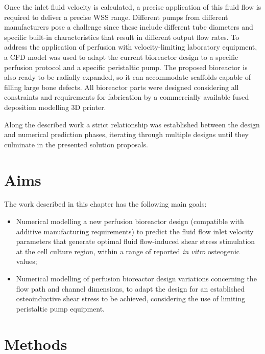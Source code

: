 Once the inlet fluid velocity is calculated, a precise application of this fluid flow is required to deliver a precise \ac{WSS} range. Different pumps from different manufacturers pose a challenge since these include different tube diameters and specific built-in characteristics that result in different output flow rates. To address the application of perfusion with velocity-limiting laboratory equipment, a \ac{CFD} model was used to adapt the current bioreactor design to a specific perfusion protocol and a specific peristaltic pump. The proposed bioreactor is also ready to be radially expanded, so it can accommodate scaffolds capable of filling large bone defects. All bioreactor parts were designed considering all constraints and requirements for fabrication by a commercially available fused deposition modelling \ac{3D} printer. 

Along the described work a strict relationship was established between the design and numerical prediction phases, iterating through multiple designs until they culminate in the presented solution proposals.



\section{Aims}
The work described in this chapter has the following main goals:
\begin{itemize}
\item Numerical modelling a new perfusion bioreactor design (compatible with additive manufacturing requirements) to predict the fluid flow inlet velocity parameters that generate optimal fluid flow-induced shear stress stimulation at the cell culture region, within a range of  reported \textit{in vitro} osteogenic values;
\item Numerical modelling of perfusion bioreactor design variations concerning the flow path and channel dimensions, to adapt the design for an established osteoinductive shear stress to be achieved, considering the use of limiting peristaltic pump equipment.
\end{itemize}




\section{Methods}

